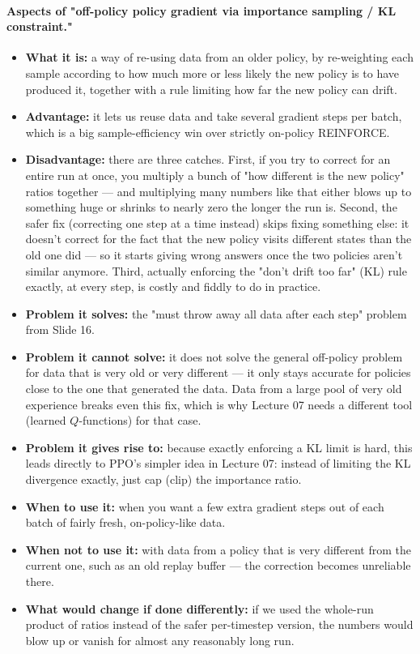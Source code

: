 \documentclass[11pt]{article}
\begin{document}
\paragraph{Aspects of "off-policy policy gradient via importance sampling / KL constraint."}
\begin{itemize}[leftmargin=*]
  \item \textbf{What it is:} a way of re-using data from an older policy, by re-weighting each sample according to how much more or less likely the new policy is to have produced it, together with a rule limiting how far the new policy can drift.
  \item \textbf{Advantage:} it lets us reuse data and take several gradient steps per batch, which is a big sample-efficiency win over strictly on-policy REINFORCE.
  \item \textbf{Disadvantage:} there are three catches. First, if you try to correct for an entire run at once, you multiply a bunch of "how different is the new policy" ratios together — and multiplying many numbers like that either blows up to something huge or shrinks to nearly zero the longer the run is. Second, the safer fix (correcting one step at a time instead) skips fixing something else: it doesn't correct for the fact that the new policy visits different states than the old one did — so it starts giving wrong answers once the two policies aren't similar anymore. Third, actually enforcing the "don't drift too far" (KL) rule exactly, at every step, is costly and fiddly to do in practice.
  \item \textbf{Problem it solves:} the "must throw away all data after each step" problem from Slide 16.
  \item \textbf{Problem it cannot solve:} it does not solve the general off-policy problem for data that is very old or very different --- it only stays accurate for policies close to the one that generated the data. Data from a large pool of very old experience breaks even this fix, which is why Lecture 07 needs a different tool (learned $Q$-functions) for that case.
  \item \textbf{Problem it gives rise to:} because exactly enforcing a KL limit is hard, this leads directly to PPO's simpler idea in Lecture 07: instead of limiting the KL divergence exactly, just cap (clip) the importance ratio.
  \item \textbf{When to use it:} when you want a few extra gradient steps out of each batch of fairly fresh, on-policy-like data.
  \item \textbf{When not to use it:} with data from a policy that is very different from the current one, such as an old replay buffer --- the correction becomes unreliable there.
  \item \textbf{What would change if done differently:} if we used the whole-run product of ratios instead of the safer per-timestep version, the numbers would blow up or vanish for almost any reasonably long run.
\end{itemize}
\end{document}
